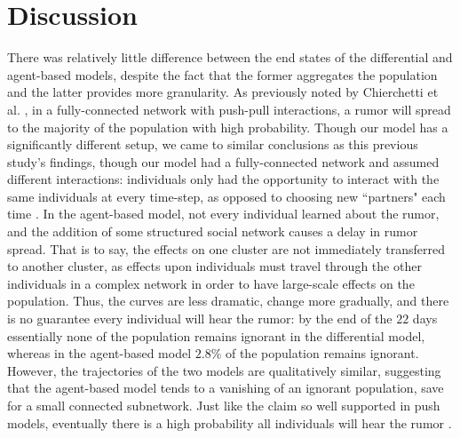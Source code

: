 \section{Discussion }
\label{sec:discussion}

There was relatively little difference between the end states of the differential and agent-based models, despite the fact that the former aggregates the population and the latter provides more granularity. As previously noted by Chierchetti et al. \cite{chierchetti-2010}, in a fully-connected network with push-pull interactions, a rumor will spread to the majority of the population with high probability. Though our model has a significantly different setup, we came to similar conclusions as this previous study's findings, though our model had a fully-connected network and assumed different interactions: individuals only had the opportunity to interact with the same individuals at every time-step, as opposed to choosing new ``partners" each time \cite{chierchetti-2010}. In the agent-based model, not every individual learned about the rumor, and the addition of some structured social network causes a delay in rumor spread. That is to say, the effects on one cluster are not immediately transferred to another cluster, as effects upon individuals must travel through the other individuals in a complex network in order to have large-scale effects on the population. Thus, the curves are less dramatic, change more gradually, and there is no guarantee every individual will hear the rumor: by the end of the $ 22 $ days essentially none of the population remains ignorant in the differential model, whereas in the agent-based model $ 2.8\% $ of the population remains ignorant. However, the trajectories of the two models are qualitatively similar, suggesting that the agent-based model tends to a vanishing of an ignorant population, save for a small connected subnetwork. Just like the claim so well supported in push models, eventually there is a high probability all individuals will hear the rumor \cite{pittel-1987, angelopoulos-2009}.


